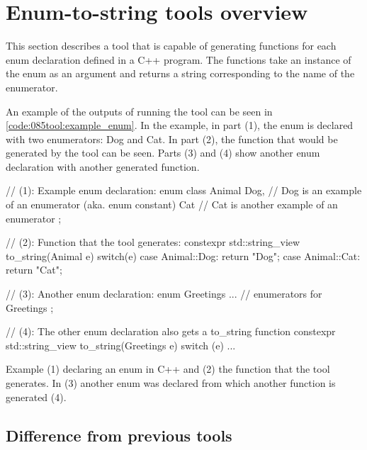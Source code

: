 \pagebreak
\section{Enum-to-string tools overview}
This section describes a tool that is capable of generating  functions for each enum declaration defined in a C++ program. The  functions take an instance of the enum as an argument and returns a string corresponding to the name of the enumerator.

An example of the outputs of running the tool can be seen in \cref{code:085tool:example_enum}. In the example, in part (1), the enum  is declared with two enumerators: Dog and Cat. In part (2), the  function that would be generated by the tool can be seen. Parts (3) and (4) show another enum declaration with another generated  function.

\begin{listing}[H]
    \begin{cppcode}
// (1): Example enum declaration:
enum class Animal{
    Dog, // Dog is an example of an enumerator (aka. enum constant)
    Cat // Cat is another example of an enumerator
};

// (2): Function that the tool generates:
constexpr std::string_view to_string(Animal e){
    switch(e) {
        case Animal::Dog: return "Dog";
        case Animal::Cat: return "Cat";
    }
}

// (3): Another enum declaration:
enum Greetings {
    ... // enumerators for Greetings
};

// (4): The other enum declaration also gets a to_string function
constexpr std::string_view to_string(Greetings e){
    switch (e) {
        ... 
    }
}
    \end{cppcode}
    \caption{Example (1) declaring an enum in C++ and (2) the  function that the tool generates. In (3) another enum was declared from which another  function is generated (4).}
    \label{code:085tool:example_enum}
\end{listing}

\subsection{Difference from previous tools}

